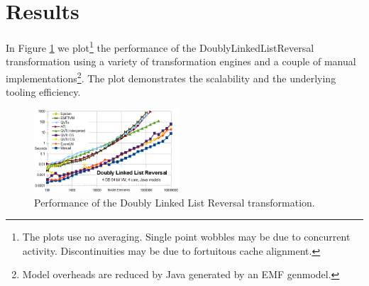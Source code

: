 \documentclass[conference]{IEEEtran}
\begin{document}


\section{Results}\label{Results}

In Figure \ref{fig:DoublyLinkedListReversalPerformance} we plot\footnote{The plots use no averaging. Single point wobbles may be due to concurrent activity. Discontinuities may be due to fortuitous cache alignment.} the performance of the DoublyLinkedListReversal transformation using a variety of transformation engines and a couple of manual implementations\footnote{Model overheads are reduced by Java generated by an EMF genmodel.}. The plot demonstrates the scalability and the underlying tooling efficiency.

\begin{figure}[h]
	\centering
	\includegraphics[width=0.48\textwidth]{DoublyLinkedListReversalPerformance.png}
	\caption{Performance of the Doubly Linked List Reversal transformation.}
	\label{fig:DoublyLinkedListReversalPerformance}
\end{figure}
\end{document}
